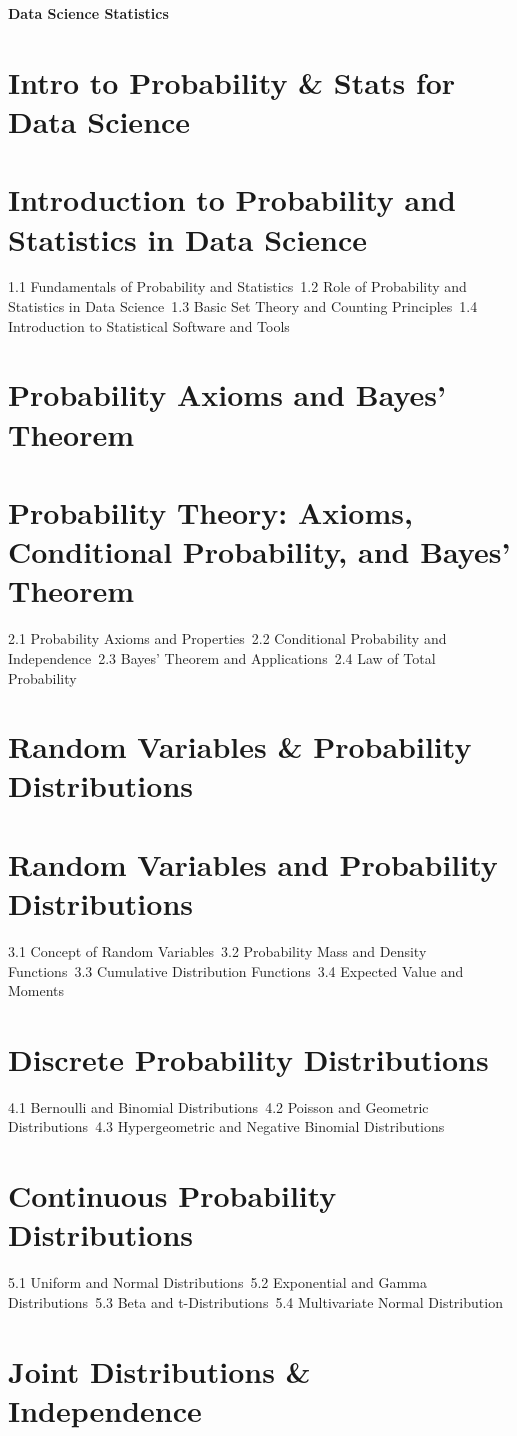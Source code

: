 {\LARGE \bf{Data Science Statistics}}
\section{Intro to Probability \& Stats for Data Science}
\section{Introduction to Probability and Statistics in Data Science}
1.1 Fundamentals of Probability and Statistics\
1.2 Role of Probability and Statistics in Data Science\
1.3 Basic Set Theory and Counting Principles\
1.4 Introduction to Statistical Software and Tools\
\section{Probability Axioms and Bayes' Theorem}
\section{Probability Theory: Axioms, Conditional Probability, and Bayes' Theorem}
2.1 Probability Axioms and Properties\
2.2 Conditional Probability and Independence\
2.3 Bayes' Theorem and Applications\
2.4 Law of Total Probability\
\section{Random Variables \& Probability Distributions}
\section{Random Variables and Probability Distributions}
3.1 Concept of Random Variables\
3.2 Probability Mass and Density Functions\
3.3 Cumulative Distribution Functions\
3.4 Expected Value and Moments\
\section{Discrete Probability Distributions}
4.1 Bernoulli and Binomial Distributions\
4.2 Poisson and Geometric Distributions\
4.3 Hypergeometric and Negative Binomial Distributions\
\section{Continuous Probability Distributions}
5.1 Uniform and Normal Distributions\
5.2 Exponential and Gamma Distributions\
5.3 Beta and t-Distributions\
5.4 Multivariate Normal Distribution\
\section{Joint Distributions \& Independence}
